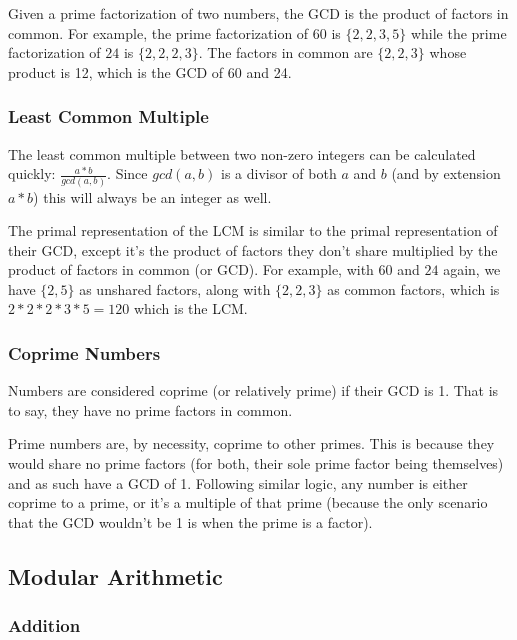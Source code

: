 Given a prime factorization of two numbers, the GCD is the product of factors in common. For example, the prime factorization of $60$ is $\{2,2,3,5\}$ while the prime factorization of $24$ is $\{2,2,2,3\}$. The factors in common are $\{2,2,3\}$ whose product is 12, which is the GCD of 60 and 24.

\subsubsection{Least Common Multiple}

The least common multiple between two non-zero integers can be calculated quickly: $\frac{a * b}{gcd(a, b)}$. Since $gcd(a, b)$ is a divisor of both $a$ and $b$ (and by extension $a * b$) this will always be an integer as well.

The primal representation of the LCM is similar to the primal representation of their GCD, except it's the product of factors they don't share multiplied by the product of factors in common (or GCD). For example, with $60$ and $24$ again, we have $\{2,5\}$ as unshared factors, along with $\{2,2,3\}$ as common factors, which is $2 * 2 * 2 * 3 * 5 = 120$ which is the LCM.

\subsubsection{Coprime Numbers}
 

Numbers are considered coprime (or relatively prime) if their GCD is 1. That is to say, they have no prime factors in common.

Prime numbers are, by necessity, coprime to other primes. This is because they would share no prime factors (for both, their sole prime factor being themselves) and as such have a GCD of 1. Following similar logic, any number is either coprime to a prime, or it's a multiple of that prime (because the only scenario that the GCD wouldn't be 1 is when the prime is a factor).

\subsection{Modular Arithmetic}

\subsubsection{Addition}

